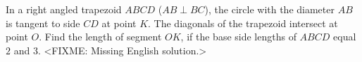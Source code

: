 \problem
In a right angled trapezoid $ABCD$ ($AB \perp BC$), the circle with the
diameter $AB$ is tangent to side $CD$ at point $K$.
The diagonals of the trapezoid intersect at point $O$.
Find the length of segment $OK$, if the base side lengths of $ABCD$ equal $2$
and $3$.
\solution
<FIXME: Missing English solution.>
\endproblem
